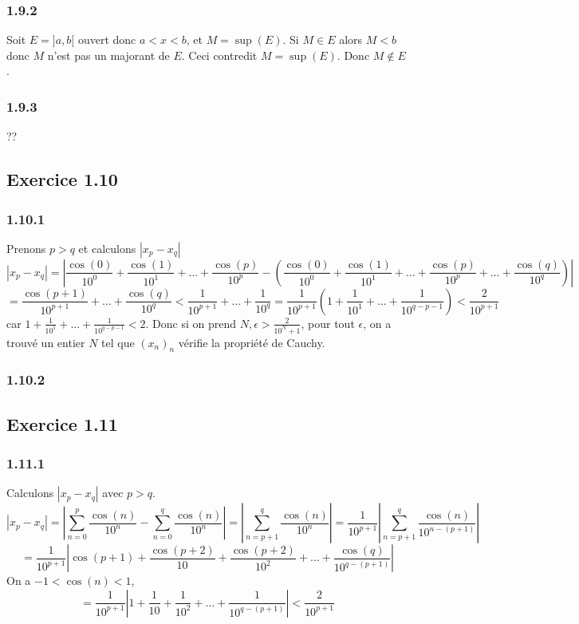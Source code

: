 \documentclass[]{book}
\theoremstyle{definition}
\begin{document}
\subsubsection*{1.9.2}
Soit $E = ]a,b[$ ouvert donc $a < x < b$, et $M = \sup(E)$. Si $M \in E$ alors $M < b$ donc $M$ n'est pas un majorant de $E$. Ceci contredit $M=\sup(E)$. Donc $M \not\in E$.  

\subsubsection*{1.9.3}
??


\subsection*{Exercice 1.10}
\subsubsection*{1.10.1}
Prenons $p > q$ et calculons $|x_p - x_q|$ 
$$|x_p - x_q| = |\frac{\cos(0)}{10^0}+\frac{\cos(1)}{10^1}+\ldots+\frac{\cos(p)}{10^p} - (\frac{\cos(0)}{10^0}+\frac{\cos(1)}{10^1}+\ldots+\frac{\cos(p)}{10^p}+\ldots+\frac{\cos(q)}{10^q})|$$
$$=\frac{\cos(p+1)}{10^{p+1}}+\ldots+\frac{\cos(q)}{10^q} < \frac{1}{10^{p+1}}+\ldots+\frac{1}{10^q} = \frac{1}{10^{p+1}}\left(1+\frac{1}{10^1}+\ldots+\frac{1}{10^{q-p-1}}\right) < \frac{2}{10^{p+1}}$$
car $1+\frac{1}{10^1}+\ldots+\frac{1}{10^{q-p-1}} < 2$. Donc si on prend $N, \epsilon > \frac{2}{10^N+1}$, pour tout $\epsilon$, on a trouv\'e un entier $N$ tel que $(x_n)_n$ v\'erifie la propri\'et\'e de Cauchy.

\subsubsection*{1.10.2}


\subsection*{Exercice 1.11}
\subsubsection*{1.11.1}
Calculons $|x_p - x_q|$ avec $p > q$. 
$$|x_p - x_q| = \left|\sum_{n=0}^{p}{\frac{\cos(n)}{10^{n}}} - \sum_{n=0}^{q}{\frac{\cos(n)}{10^{n}}}\right| = \left|\sum_{n=p+1}^{q}{\frac{\cos(n)}{10^{n}}}\right| = \frac{1}{10^{p+1}}\left|\sum_{n=p+1}^{q}{\frac{\cos(n)}{10^{n-(p+1)}}}\right| $$
$$= \frac{1}{10^{p+1}}\left|\cos(p+1)+\frac{\cos(p+2)}{10}+\frac{\cos(p+2)}{10^2}+ \ldots +\frac{\cos(q)}{10^{q-(p+1)}}\right|$$
On a $-1<\cos(n)<1$, 
$$= \frac{1}{10^{p+1}}\left|1+\frac{1}{10}+\frac{1}{10^2}+ \ldots +\frac{1}{10^{q-(p+1)}}\right| < \frac{2}{10^{p+1}}$$
\end{document}

